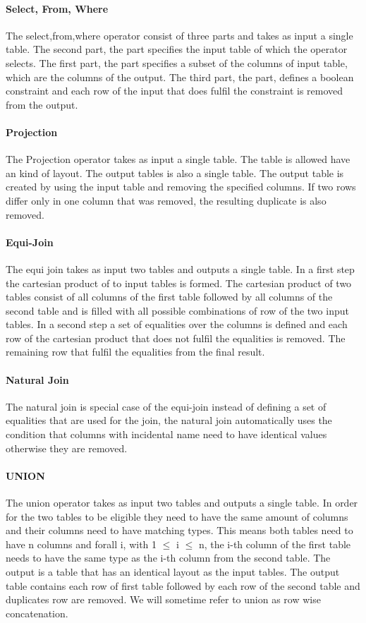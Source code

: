 \paragraph{Select, From, Where}
The select,from,where operator consist of three parts and takes as input a single table. The second part, the  part specifies the input table of which the operator selects. The first part, the  part specifies a subset of the columns of input table, which are the columns of the output.
The third part, the  part, defines a boolean constraint and each row of the input that does fulfil the constraint is removed from the output. 
\paragraph{Projection}
The Projection operator takes as input a single table. The table is allowed have an kind of layout. The output tables is also a single table. The output table is created by using the input table and removing the specified columns. If two rows differ only in one column that was removed, the resulting duplicate is also removed. 
\paragraph{Equi-Join}
The equi join takes as input two tables and outputs a single table. In a first step the cartesian product of to input tables is formed. The cartesian product of two tables consist of all columns of the first table followed by all columns of the second table and is filled with all possible combinations of row of the two input tables. In a second step a set of equalities over the columns is defined and each row of the cartesian product that does not fulfil the equalities is removed. The remaining row that fulfil the equalities from the final result.
\paragraph{Natural Join}
The natural join is special case of the equi-join instead of defining a set of equalities that are used for the join, the natural join automatically uses the condition that columns with incidental name need to have identical values otherwise they are removed. 

\paragraph{UNION}
The union operator takes as input two tables and outputs a single table. In order for the two tables to be eligible they need to have the same amount of columns and their columns need to have matching types. This means both tables need to have n columns and forall i, with  1 $\leq$ i $\leq$ n, the i-th column of the first table needs to have the same type as the i-th column from the second table. The output is a table that has an identical layout as the input tables.
The output table contains each row of first table followed by each row of the second table and duplicates row are removed. We will sometime refer to union as row wise concatenation.

